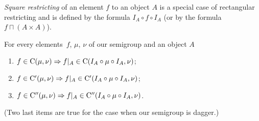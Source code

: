\emph{Square restricting} of an element
$f$ to an object $A$ is a special case of rectangular restricting
and is defined by the formula $I_{A}\circ f\circ I_{A}$ (or by the
formula $f\sqcap(A\times A)$).
\begin{thm}
\label{rect-cont}For every elements~$f$, $\mu$, $\nu$ of our semigroup
and an object $A$
\begin{enumerate}
\item \label{contrestr-C}$f\in\mathrm{C}(\mu,\nu)\Rightarrow f|_{A}\in\mathrm{C}(I_{A}\circ\mu\circ I_{A},\nu)$;
\item \label{contrestr-Ci}$f\in\mathrm{C}'(\mu,\nu)\Rightarrow f|_{A}\in\mathrm{C}'(I_{A}\circ\mu\circ I_{A},\nu)$;
\item \label{contrestr-Cii}$f\in\mathrm{C}''(\mu,\nu)\Rightarrow f|_{A}\in\mathrm{C}''(I_{A}\circ\mu\circ I_{A},\nu)$. 
\end{enumerate}

(Two last items are true for the case when our semigroup is dagger.)

\end{thm}

